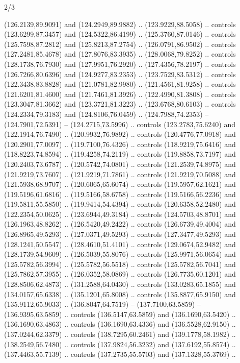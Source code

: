 \begin{flagdescription}{2/3}
\begin{scope}[xshift=0.5\flaglength,yshift=0.5\flagwidth,scale=\flagwidth/180]
\begin{scope}[y=0.8pt, x=0.8pt, yscale=-1,shift={(-168.75,-108.75)}]
  (126.2139,89.9091) and (124.2949,89.9882) .. (123.9229,88.5058) .. controls
  (123.6299,87.3457) and (124.5322,86.4199) .. (125.3760,87.0146) .. controls
  (125.7598,87.2812) and (125.8213,87.2754) .. (126.0791,86.9502) .. controls
  (127.2481,85.4678) and (127.8076,83.3935) .. (128.0068,79.8252) .. controls
  (128.1738,76.7930) and (127.9951,76.2920) .. (127.4356,78.2197) .. controls
  (126.7266,80.6396) and (124.9277,83.2353) .. (123.7529,83.5312) .. controls
  (122.3438,83.8828) and (121.0781,82.9980) .. (121.4561,81.9258) .. controls
  (121.6201,81.4600) and (121.7461,81.3926) .. (122.4990,81.3808) .. controls
  (123.3047,81.3662) and (123.3721,81.3223) .. (123.6768,80.6103) .. controls
  (124.2334,79.3183) and (124.8106,76.0459) .. (124.7988,74.2353) --
  (124.7901,72.5391) -- (124.2715,73.5996) .. controls (123.2783,75.6240) and
  (122.1914,76.7490) .. (120.9932,76.9892) .. controls (120.4776,77.0918) and
  (120.2901,77.0097) .. (119.7100,76.4326) .. controls (118.9219,75.6416) and
  (118.8223,74.8594) .. (119.4258,74.2119) .. controls (119.8858,73.7197) and
  (120.2403,73.6787) .. (120.5742,74.0801) .. controls (121.2539,74.8975) and
  (121.9219,73.7607) .. (121.9219,71.7861) .. controls (121.9219,70.5088) and
  (121.5938,68.9707) .. (120.6065,65.6074) .. controls (119.5957,62.1621) and
  (119.5196,61.6816) .. (119.5166,58.6758) .. controls (119.5166,56.2236) and
  (119.5811,55.5850) .. (119.9414,54.4394) .. controls (120.6358,52.2480) and
  (122.2354,50.0625) .. (123.6944,49.3184) .. controls (124.5703,48.8701) and
  (126.1963,48.8262) .. (126.5420,49.2422) .. controls (126.6739,49.4004) and
  (126.8965,49.5293) .. (127.0371,49.5293) .. controls (127.3477,49.5293) and
  (128.1241,50.5547) .. (128.4610,51.4101) .. controls (129.0674,52.9482) and
  (128.1739,54.9609) .. (126.5039,55.8076) .. controls (125.9971,56.0654) and
  (125.5782,56.3994) .. (125.5782,56.5518) .. controls (125.5782,56.7041) and
  (125.7862,57.3955) .. (126.0352,58.0869) .. controls (126.7735,60.1201) and
  (128.8506,62.4873) .. (131.2588,64.0430) .. controls (133.0283,65.1855) and
  (134.0157,65.6338) .. (135.1201,65.8008) .. controls (135.8877,65.9150) and
  (135.9112,65.9033) .. (136.8047,64.7519) -- (137.7100,63.5859) --
  (136.9395,63.5859) .. controls (136.5147,63.5859) and (136.1690,63.5420) ..
  (136.1690,63.4863) .. controls (136.1690,63.4336) and (136.5528,62.9150) ..
  (137.0244,62.3379) .. controls (138.7295,60.2461) and (139.1778,58.1982) ..
  (138.2549,56.7480) .. controls (137.9824,56.3232) and (137.6192,55.8574) ..
  (137.4463,55.7139) .. controls (137.2735,55.5703) and (137.1328,55.3769) ..

\end{scope}
\end{scope}
\end{flagdescription}
